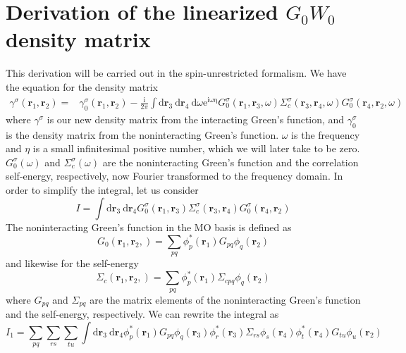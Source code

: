 \documentclass[12pt]{caltech_thesis}
\begin{document}
\chapter{Derivation of the linearized $G_0W_0$ density matrix}
This derivation will be carried out in the spin-unrestricted formalism.
\label{applinearized_gw}
We have the equation for the density matrix
\begin{equation}
\begin{aligned}
\gamma^\sigma\left(\mathbf{r}_1, \mathbf{r}_2\right)= & \gamma_0^\sigma\left(\mathbf{r}_1, \mathbf{r}_2\right) -\frac{\mathrm{i}}{2 \pi} \int \mathrm{d} \mathbf{r}_3 \mathrm{~d} \mathbf{r}_4 \mathrm{~d} \omega \mathrm{e}^{\mathrm{i \omega \eta}} G_0^\sigma\left(\mathbf{r}_1, \mathbf{r}_3, \omega\right) \Sigma_c^\sigma\left(\mathbf{r}_3, \mathbf{r}_4, \omega\right) G_0^\sigma\left(\mathbf{r}_4, \mathbf{r}_2, \omega\right)
\label{eqninit_dm}
\end{aligned}
\end{equation}
where $\gamma^\sigma$ is our new density matrix from the interacting Green's function, and $\gamma_0^\sigma$ is the density matrix from the noninteracting Green's function. $\omega$ is the frequency and $\eta$ is a small infinitesimal positive number, which we will later take to be zero. $G_0^\sigma(\omega)$ and $\Sigma_c^\sigma(\omega)$ are the noninteracting Green's function and the correlation self-energy, respectively, now Fourier transformed to the frequency domain.
In order to simplify the integral, let us consider
\begin{equation}
I = \int \mathrm{d} \mathbf{r}_3 \mathrm{~d} \mathbf{r}_4  G_0^\sigma\left(\mathbf{r}_1, \mathbf{r}_3\right) \Sigma_c^\sigma\left(\mathbf{r}_3, \mathbf{r}_4\right) G_0^\sigma\left(\mathbf{r}_4, \mathbf{r}_2\right)
\end{equation}
The noninteracting Green's function in the MO basis is defined as
\begin{equation}
G_0\left(\mathbf{r}_1, \mathbf{r}_2, \right) = \sum_{pq} \phi_p^*(\mathbf{r}_1) G_{p q} \phi_q(\mathbf{r}_2)
\end{equation}
and likewise for the self-energy
\begin{equation}
\Sigma_c\left(\mathbf{r}_1, \mathbf{r}_2, \right) = \sum_{pq} \phi_p^*(\mathbf{r}_1) \Sigma_{c pq} \phi_q(\mathbf{r}_2)
\end{equation}
where $G_{p q}$ and $\Sigma_{p q}$ are the matrix elements of the noninteracting Green's function and the self-energy, respectively. We can rewrite the integral as
\begin{equation}
I_1 = \sum_{pq} \sum_{rs} \sum_{tu} \int \mathrm{d} \mathbf{r}_3 \mathrm{~d} \mathbf{r}_4 \phi_p^*(\mathbf{r}_1) G_{p q} \phi_q(\mathbf{r}_3) \phi_r^*(\mathbf{r}_3) \Sigma_{r s} \phi_s(\mathbf{r}_4) \phi_t^*(\mathbf{r}_4) G_{t u} \phi_u(\mathbf{r}_2)
\end{equation}
\end{document}
